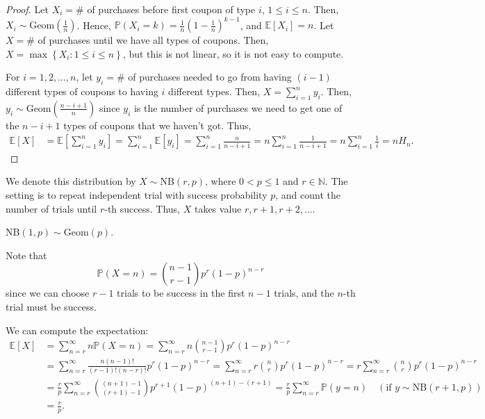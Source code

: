 \begin{proof}
    Let \(X_i = \#\) of purchases before first coupon of type \(i\), \(1 \le i \le n\). Then, \(X_i \sim \mathrm{Geom}(\frac{1}{n}) \). Hence, \(\mathbb{P} (X_i = k) = \frac{1}{n} \left( 1 - \frac{1}{n} \right)^{k-1} \), and \(\mathbb{E} [X_i] = n\). Let \(X = \#\) of purchases until we have all types of coupons. Then, \(X = \max \left\{ X_i: 1 \le i \le n \right\} \), but this is not linear, so it is not easy to compute. 
    
    For \(i = 1, 2, \dots , n\), let \(y_i = \#\) of purchases needed to go from having \((i - 1)\) different types of coupons to having \(i\) different types. Then, \(X = \sum_{i=1}^n y_i \). Then, \(y_i \sim \mathrm{Geom}\left( \frac{n-i+1}{n} \right)  \) since \(y_i\) is the number of purchases we need to get one of the \(n - i + 1\) types of coupons that we haven't got. Thus,
    \begin{align*}
        \mathbb{E} [X] &= \mathbb{E} \left[ \sum_{i=1}^n y_i  \right] = \sum_{i=1}^n \mathbb{E} [y_i] = \sum_{i=1}^n \frac{n}{n - i + 1} = n \sum_{i=1}^n \frac{1}{n - i + 1} = n \sum_{i=1}^n \frac{1}{i} = n H_n.     
    \end{align*}               
\end{proof}

\begin{definition}
    We denote this distribution by \(X \sim \mathrm{NB}(r, p) \), where \(0 < p \le 1\) and \(r \in \mathbb{N} \). The setting is to repeat independent trial with success probability \(p\), and count the number of trials until \(r\)-th success. Thus, \(X\) takes value \(r, r+1, r+2, \dots \).       
\end{definition}

\begin{observation}
    \(\mathrm{NB}(1, p) \sim \mathrm{Geom}(p) \).  
\end{observation}

Note that 
\[
    \mathbb{P} (X = n) = \binom{n - 1}{r - 1} p^r (1 - p)^{n - r}    
\]
since we can choose \(r - 1\) trials to be success in the first \(n - 1\) trials, and the \(n\)-th trial must be success. 

We can compute the expectation:
\begin{align*}
    \mathbb{E} [X] &= \sum_{n=r}^{\infty} n \mathbb{P} (X = n) = \sum_{n=r}^{\infty} n \binom{n-1}{r-1} p^r (1 - p)^{n - r} \\
    &= \sum_{n=r}^{\infty} \frac{n(n-1)!}{(r-1)!(n-r)!} p^r (1 - p)^{n - r} = \sum_{n=r}^{\infty} r \binom{n}{r} p^r (1-p)^{n-r} = r \sum_{n=r}^{\infty} \binom{n}{r} p^r (1-p)^{n-r} \\
    &= \frac{r}{p} \sum_{n=r}^{\infty} \binom{(n+1)-1}{(r+1)-1} p^{r+1} (1-p)^{(n+1)-(r+1)} = \frac{r}{p} \sum_{n=r}^{\infty} \mathbb{P} (y = n) \quad (\text{if } y \sim \mathrm{NB}(r+1, p)) \\
    &= \frac{r}{p}.        
\end{align*}

